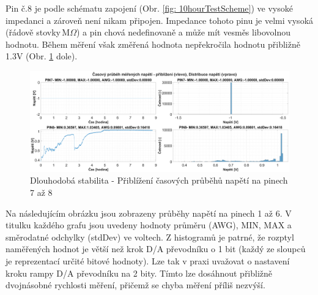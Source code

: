 Pin č.8 je podle schématu zapojení (Obr. \ref{fig: 10hourTestScheme}) ve vysoké impedanci a zároveň není nikam připojen.
Impedance tohoto pinu je velmi vysoká (řádově stovky\,M$\Omega$) a pin chová nedefinovaně a může mít vesměs libovolnou hodnotu.
Během měření však změřená hodnota nepřekročila hodnotu přibližně 1.3V (Obr. \ref{fig: 10hourTest Voltage PINS7TO8} dole).
\begin{figure}[ht!]
    \centering
    \includegraphics[width = 1\textwidth]{obrazky/matlab_generated/VOLTAGE_TESTER/dlouhodoba_stabilita_voltage_part2.eps}
    \caption{Dlouhodobá stabilita - Přiblížení časových průběhů napětí na pinech 7 až 8}
    \label{fig: 10hourTest Voltage PINS7TO8}
\end{figure}

\clearpage
Na následujícím obrázku jsou zobrazeny průběhy napětí na pinech 1 až 6.
V titulku každého grafu jsou uvedeny hodnoty průměru (AWG), MIN, MAX a směrodatné odchylky (stdDev) ve voltech.
Z histogramů je patrné, že rozptyl naměřených hodnot je větší než krok D/A převodníku o 1 bit
(každý ze sloupců je reprezentací určité bitové hodnoty). Lze tak v praxi uvažovat o nastavení kroku rampy
D/A převodníku na 2 bity. Tímto lze dosáhnout přibližně dvojnásobné rychlosti měření, přičemž se chyba měření příliš nezvýší.\par

